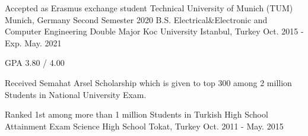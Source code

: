 

\begin{cventries}

\cventry
    {Accepted as Erasmus exchange student}
    {Technical University of Munich (TUM)} %
    {Munich, Germany} %
    {Second Semester 2020} %
    {} 
  \vspace{-3mm}
  \cventry
    {B.S. Electrical\&Electronic and Computer Engineering Double Major} %
    {Koc University } %
    {Istanbul, Turkey} %
    {Oct. 2015 - Exp. May. 2021} %
    {
      \begin{cvitems} %
        \item {GPA 3.80 / 4.00}
        \item {Received Semahat Arsel Scholarship which is given to top 300 among 2 million Students in National University Exam.}
      \end{cvitems}
    } 
  \cventry
    {Ranked 1st among more than 1 million Students in Turkish High School Attainment Exam}
    {Science High School} %
    {Tokat, Turkey} %
    {Oct. 2011 - May. 2015} %
    {}
\end{cventries}
